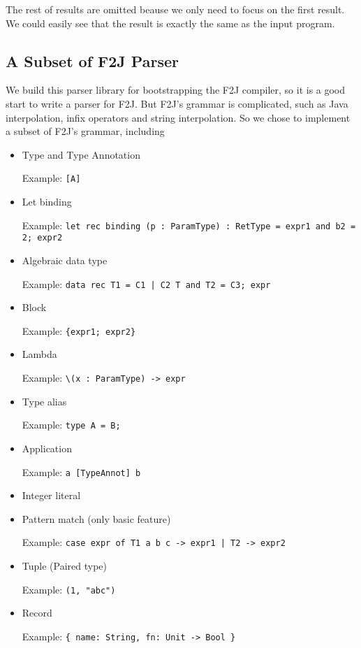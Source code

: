 The rest of results are omitted beause we only need to focus on the first result. We could easily see that the result is exactly the same as the input program.

\subsection{A Subset of F2J Parser} \label{section:f2j_parser}

We build this parser library for bootstrapping the F2J compiler, so it is a good start to write a parser for F2J. But F2J's grammar is complicated, such as Java interpolation, infix operators and string interpolation. So we chose to implement a subset of F2J's grammar, including

\begin{itemize}
\item Type and Type Annotation

Example: \texttt{[A]}

\item Let binding

Example: \texttt{let rec binding (p : ParamType) : RetType = expr1 and b2 = 2; expr2}

\item Algebraic data type

Example: \texttt{data rec T1 = C1 | C2 T and T2 = C3; expr}

\item Block

Example: \texttt{\{expr1; expr2\}}

\item Lambda

Example: \texttt{\textbackslash (x : ParamType) -> expr}

\item Type alias

Example: \texttt{type A = B;}

\item Application

Example: \texttt{a [TypeAnnot] b}

\item Integer literal
\item Pattern match (only basic feature)

Example: \texttt{case expr of T1 a b c -> expr1 | T2 -> expr2}

\item Tuple (Paired type)

Example: \texttt{(1, "abc")}

\item Record

Example: \texttt{\{ name: String, fn: Unit -> Bool \}}

\end{itemize}


